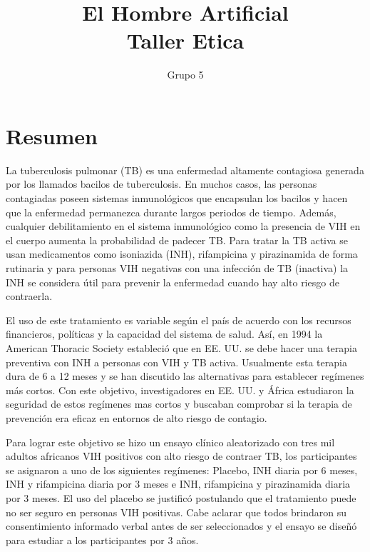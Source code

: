 \documentclass{report}
\title{\Huge{El Hombre Artificial}\\Taller Etica}
\author{\huge{Grupo 5}}
\date{}
\begin{document}
\maketitle
\newpage%
\tableofcontents
\pagebreak


\chapter{Resumen}

La tuberculosis pulmonar (TB) es una enfermedad altamente contagiosa generada por los llamados bacilos de tuberculosis. En muchos casos, las personas contagiadas poseen sistemas inmunológicos que encapsulan los bacilos y hacen que la enfermedad permanezca durante largos periodos de tiempo. Además, cualquier debilitamiento en el sistema inmunológico como la presencia de VIH en el cuerpo aumenta la probabilidad de padecer TB. Para tratar la TB activa se usan medicamentos como isoniazida (INH), rifampicina y pirazinamida de forma rutinaria y para personas VIH negativas con una infección de TB (inactiva) la INH se considera útil para prevenir la enfermedad cuando hay alto riesgo de contraerla.

El uso de este tratamiento es variable según el país de acuerdo con los recursos financieros, políticas y la capacidad del sistema de salud. Así, en 1994 la American Thoracic Society estableció que en EE. UU. se debe hacer una terapia preventiva con INH a personas con VIH y TB activa. Usualmente esta terapia dura de 6 a 12 meses y se han discutido las alternativas para establecer regímenes más cortos. Con este objetivo, investigadores en EE. UU. y África estudiaron la seguridad de estos regímenes mas cortos y buscaban comprobar si la terapia de prevención era eficaz en entornos de alto riesgo de contagio.

Para lograr este objetivo se hizo un ensayo clínico aleatorizado con tres mil adultos africanos VIH positivos con alto riesgo de contraer TB, los participantes se asignaron a uno de los siguientes regímenes: Placebo, INH diaria por 6 meses, INH y rifampicina diaria por 3 meses e INH, rifampicina y pirazinamida diaria por 3 meses. El uso del placebo se justificó postulando que el tratamiento puede no ser seguro en personas VIH positivas. Cabe aclarar que todos brindaron su consentimiento informado verbal antes de ser seleccionados y el ensayo se diseñó para estudiar a los participantes por 3 años.
\end{document}
